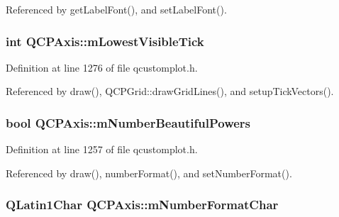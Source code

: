 Referenced by get\+Label\+Font(), and set\+Label\+Font().

\hypertarget{class_q_c_p_axis_aebb24ba8734b7e054efc6e1ecc5414c7}{}
\subsubsection[{m\+Lowest\+Visible\+Tick}]{\setlength{\rightskip}{0pt plus 5cm}int Q\+C\+P\+Axis\+::m\+Lowest\+Visible\+Tick\hspace{0.3cm}{\ttfamily [protected]}}\label{class_q_c_p_axis_aebb24ba8734b7e054efc6e1ecc5414c7}


Definition at line 1276 of file qcustomplot.\+h.



Referenced by draw(), Q\+C\+P\+Grid\+::draw\+Grid\+Lines(), and setup\+Tick\+Vectors().

\hypertarget{class_q_c_p_axis_af03809bee3f3e35fcc38d25b6dd5003b}{}
\subsubsection[{m\+Number\+Beautiful\+Powers}]{\setlength{\rightskip}{0pt plus 5cm}bool Q\+C\+P\+Axis\+::m\+Number\+Beautiful\+Powers\hspace{0.3cm}{\ttfamily [protected]}}\label{class_q_c_p_axis_af03809bee3f3e35fcc38d25b6dd5003b}


Definition at line 1257 of file qcustomplot.\+h.



Referenced by draw(), number\+Format(), and set\+Number\+Format().

\hypertarget{class_q_c_p_axis_a39594313deef458f425bba25cd337a8a}{}
\subsubsection[{m\+Number\+Format\+Char}]{\setlength{\rightskip}{0pt plus 5cm}Q\+Latin1\+Char Q\+C\+P\+Axis\+::m\+Number\+Format\+Char\hspace{0.3cm}{\ttfamily [protected]}}\label{class_q_c_p_axis_a39594313deef458f425bba25cd337a8a}


